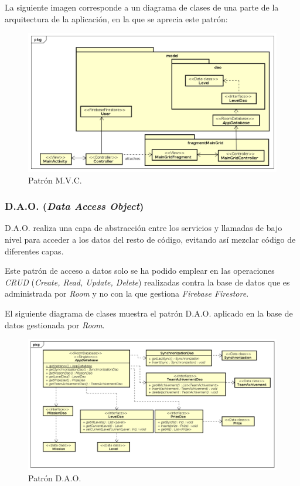 \documentclass[twoside]{report}
\begin{document}

La siguiente imagen corresponde a un diagrama de clases de una parte de la arquitectura de la aplicación, en la que se aprecia este patrón:

\begin{figure}[H]
\centering
\includegraphics[scale=0.45]{images/mvcPattern}
\caption{Patrón M.V.C.}
\end{figure}

\subsubsection{D.A.O. (\textit{Data Access Object})}

D.A.O. realiza una capa de abstracción entre los servicios y llamadas de bajo nivel para acceder a los datos del resto de código, evitando así mezclar código de diferentes capas.

Este patrón de acceso a datos solo se ha podido emplear en las operaciones \textit{CRUD} (\textit{Create, Read, Update, Delete}) realizadas contra la base de datos que es administrada por \textit{Room} \cite{roompersistence} y no con la que gestiona \textit{Firebase Firestore}.

El siguiente diagrama de clases muestra el patrón D.A.O. aplicado en la base de datos gestionada por \textit{Room}.

\begin{figure}[H]
\centering
\includegraphics[scale=0.45]{images/roomDao}
\caption{Patrón D.A.O.}
\end{figure}
\end{document}
